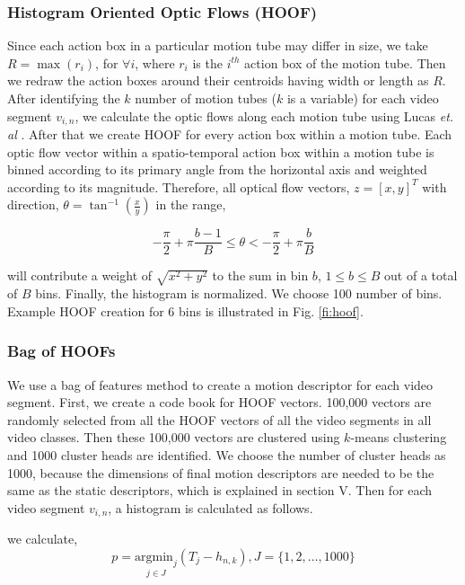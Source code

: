 \subsubsection{Histogram Oriented Optic Flows (HOOF)}
Since each action box in a particular motion tube may differ in size, we take $R = \max(r_{i})$, for $\forall{i}$,
where $r_{i}$ is the $i^{th}$ action box of the motion tube. Then we redraw the action boxes around their centroids having width or length as $R$.
After identifying the $k$ number of motion tubes ($k$ is a variable) for each video segment $v_{i,n}$, we calculate the optic flows along each motion tube
using Lucas \textit{et. al} \cite{lucas1981iterative}.
After that we create HOOF\cite{chaudhry2009histograms} for every
    action box within a motion tube. Each optic flow vector within a spatio-temporal action box within a motion tube is binned according
    to its primary angle from the horizontal axis and weighted according to its magnitude.  Therefore, all optical flow vectors, $z=[x,y]^T$ with direction,
$\theta = \tan^{-1}(\frac{x}{y})$ in the range,

\begin{equation}
- \frac{\pi}{2} + \pi\frac{b-1}{B} \leq \theta < -\frac{\pi}{2} + \pi\frac{b}{B}
\end{equation}

will contribute a weight of $\sqrt{x^2 + y^2}$ to the sum in bin $b$, $1 \leq b \leq B$ out of a total of
$B$ bins. Finally, the histogram is normalized. We choose 100 number of bins. Example HOOF creation for 6 bins is illustrated in Fig. \ref{fi:hoof}.

\subsubsection{Bag of HOOFs}
We use a bag of features method to create a motion descriptor for each video segment. First, we create a code book for HOOF vectors.
100,000 vectors are randomly selected from all the HOOF vectors of all the video segments in all video classes.
Then these 100,000 vectors are clustered using $k$-means clustering and 1000 cluster heads
are identified. We choose the number of cluster heads as 1000, because the dimensions of final motion descriptors are needed to be the same as
the static descriptors, which is explained in section V. Then for each video segment $v_{i,n}$, a histogram is calculated as follows.


we calculate,
\begin{equation}
p = \underset{j\in J}{\mathrm{argmin}_{j}}(T_{j}-h_{n,k}), J=\{1,2,\dots,1000\}
\end{equation}

